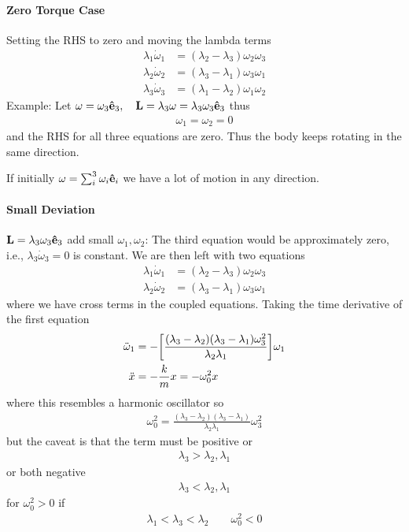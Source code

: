 \documentclass[../main.tex]{subfiles}
\begin{document}
\paragraph*{Zero Torque Case} Setting the RHS to zero and moving the lambda terms
\begin{align*}
    \lambda_1 \dot \omega_1 &= (\lambda_2 - \lambda_3) \omega_2 \omega_3 \\
    \lambda_2 \dot \omega_2 &= (\lambda_3 - \lambda_1) \omega_3 \omega_1 \\
    \lambda_3 \dot \omega_3 &= (\lambda_1 - \lambda_2) \omega_1 \omega_2
\end{align*}
Example: Let $\vb \omega = \omega_3 \vu e_3, \quad \vb L = \lambda_3 \vb \omega = \lambda_3 \omega_3 \vu e_3$
thus
\begin{align*}
    \omega_1 = \omega_2 = 0
\end{align*}
and the RHS for all three equations are zero. Thus the body keeps rotating in the same direction. 

If initially $\vb \omega = \sum_i^3 \omega_i \vu e_i$ we have a lot of motion in any direction.
\paragraph*{Small Deviation} $\vb L = \lambda_3 \omega_3 \vu e_3$ add small $\omega_1, \omega_2$: 
The third equation would be approximately zero, i.e., $\lambda_3 \dot \omega_3 = 0$ is constant. 
We are then left with two equations
\begin{align*}
    \lambda_1 \dot \omega_1 &= (\lambda_2 - \lambda_3) \omega_2 \omega_3 \\
    \lambda_2 \dot \omega_2 &= (\lambda_3 - \lambda_1) \omega_3 \omega_1
\end{align*}
where we have cross terms in the coupled equations. Taking the time derivative of the first equation
\begin{align*}
    \ddot \omega_1 &= -\qt[\frac{(\lambda_3 - \lambda_2)(\lambda_3 - \lambda_1) \omega_3^2}{\lambda_2 \lambda_1}] \omega_1 \\
    \ddot x &= - \frac{k}{m} x = - \omega_0^2 x
\end{align*}
where this resembles a harmonic oscillator so
\begin{align*}
    \omega_0^2 = \frac{(\lambda_3 - \lambda_2)(\lambda_3 - \lambda_1)}{\lambda_2 \lambda_1} \omega_3^2
\end{align*}
but the caveat is that the term must be positive or
\begin{align*}
    \lambda_3 > \lambda_2, \lambda_1
\end{align*}
or both negative
\begin{align*}
    \lambda_3 < \lambda_2, \lambda_1
\end{align*}
for $\omega_0^2 > 0$ 
if
\begin{align*}
    \lambda_1 < \lambda_3 < \lambda_2 \qquad \omega_0^2 < 0
\end{align*}
\end{document}
